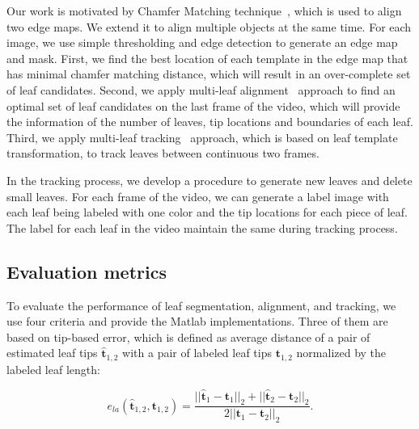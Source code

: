 Our work is motivated by Chamfer Matching technique~\cite{barrow1977parametric}, which is used to align two edge maps.
We extend it to align multiple objects at the same time.
For each image, we use simple thresholding and edge detection to generate an edge map and mask.
First, we find the best location of each template in the edge map that has minimal chamfer matching distance, which will result in an over-complete set of leaf candidates.
Second, we apply multi-leaf alignment~\cite{yin2014a} approach to find an optimal set of leaf candidates on the last frame of the video, which will provide the information of the number of leaves, tip locations and boundaries of each leaf.
Third, we apply multi-leaf tracking~\cite{yin2014b} approach, which is based on leaf template transformation, to track leaves between continuous two frames.

In the tracking process, we develop a procedure to generate new leaves and delete small leaves.
For each frame of the video, we can generate a label image with each leaf being labeled with one color and the tip locations for each piece of leaf.
The label for each leaf in the video maintain the same during tracking process.


\subsection{Evaluation metrics}
To evaluate the performance of leaf segmentation, alignment, and tracking, we use four criteria and provide the Matlab implementations.
Three of them are based on tip-based error, which is defined as average distance of a pair of estimated leaf tips $\hat{\bm{t}}_{1,2}$ with a pair of labeled leaf tips $ \bm{t}_{1,2}$ normalized by the labeled leaf length:

\begin {equation}
e_{la}(\hat{\bm{t}}_{1,2}, \bm{t}_{1,2}) = \frac{||\hat{\bm{t}}_1-{\bm{t}}_1||_2 + ||\hat{\bm{t}}_2-{\bm{t}}_2||_2}{2 ||\bm{t}_1-\bm{t}_2||_2}.
\label{eqn:tipError}
\end{equation}

